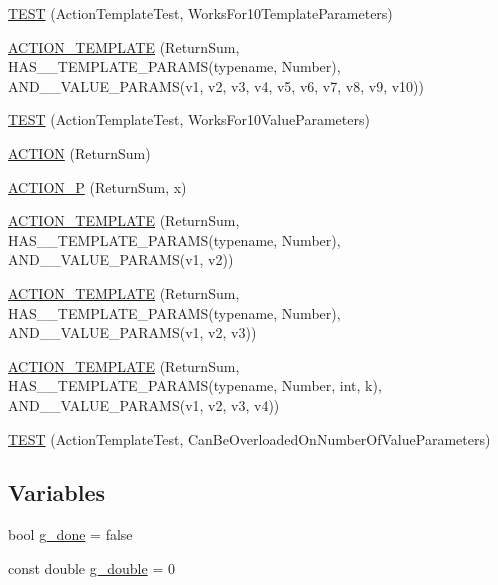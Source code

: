 \begin{DoxyCompactItemize}
\item 
\hyperlink{namespacetesting_1_1gmock__generated__actions__test_a39707e50b998b0866ea7dec54099f38f}{T\+E\+ST} (Action\+Template\+Test, Works\+For10\+Template\+Parameters)
\item 
\hyperlink{namespacetesting_1_1gmock__generated__actions__test_a0e21a6c1f43a7125a29e6e1edcd7006c}{A\+C\+T\+I\+O\+N\+\_\+\+T\+E\+M\+P\+L\+A\+TE} (Return\+Sum, H\+A\+S\+\_\+\_\+\+T\+E\+M\+P\+L\+A\+T\+E\+\_\+\+P\+A\+R\+A\+MS(typename, Number), A\+N\+D\+\_\+\_\+\+V\+A\+L\+U\+E\+\_\+\+P\+A\+R\+A\+MS(v1, v2, v3, v4, v5, v6, v7, v8, v9, v10))
\item 
\hyperlink{namespacetesting_1_1gmock__generated__actions__test_aa8dd9ea1777fe67626bab2815b7261f4}{T\+E\+ST} (Action\+Template\+Test, Works\+For10\+Value\+Parameters)
\item 
\hyperlink{namespacetesting_1_1gmock__generated__actions__test_a49c180470c75de1ab88cd2928e738d33}{A\+C\+T\+I\+ON} (Return\+Sum)
\item 
\hyperlink{namespacetesting_1_1gmock__generated__actions__test_acae7628c76df0e3b54ea80459fe3cf60}{A\+C\+T\+I\+O\+N\+\_\+P} (Return\+Sum, x)
\item 
\hyperlink{namespacetesting_1_1gmock__generated__actions__test_a0d95dcce021580cf2a2af2a91348a01b}{A\+C\+T\+I\+O\+N\+\_\+\+T\+E\+M\+P\+L\+A\+TE} (Return\+Sum, H\+A\+S\+\_\+\_\+\+T\+E\+M\+P\+L\+A\+T\+E\+\_\+\+P\+A\+R\+A\+MS(typename, Number), A\+N\+D\+\_\+\_\+\+V\+A\+L\+U\+E\+\_\+\+P\+A\+R\+A\+MS(v1, v2))
\item 
\hyperlink{namespacetesting_1_1gmock__generated__actions__test_a5241672e22af49093d3601ac42c9a5ca}{A\+C\+T\+I\+O\+N\+\_\+\+T\+E\+M\+P\+L\+A\+TE} (Return\+Sum, H\+A\+S\+\_\+\_\+\+T\+E\+M\+P\+L\+A\+T\+E\+\_\+\+P\+A\+R\+A\+MS(typename, Number), A\+N\+D\+\_\+\_\+\+V\+A\+L\+U\+E\+\_\+\+P\+A\+R\+A\+MS(v1, v2, v3))
\item 
\hyperlink{namespacetesting_1_1gmock__generated__actions__test_a03e55dabaa60ff2cda602c702ef3ff76}{A\+C\+T\+I\+O\+N\+\_\+\+T\+E\+M\+P\+L\+A\+TE} (Return\+Sum, H\+A\+S\+\_\+\_\+\+T\+E\+M\+P\+L\+A\+T\+E\+\_\+\+P\+A\+R\+A\+MS(typename, Number, int, k), A\+N\+D\+\_\+\_\+\+V\+A\+L\+U\+E\+\_\+\+P\+A\+R\+A\+MS(v1, v2, v3, v4))
\item 
\hyperlink{namespacetesting_1_1gmock__generated__actions__test_aa84c5b4f29e052340459e12649ce7209}{T\+E\+ST} (Action\+Template\+Test, Can\+Be\+Overloaded\+On\+Number\+Of\+Value\+Parameters)
\end{DoxyCompactItemize}
\subsection*{Variables}
\begin{DoxyCompactItemize}
\item 
bool \hyperlink{namespacetesting_1_1gmock__generated__actions__test_a5f828d39e27f0615498d5aa31c96916e}{g\+\_\+done} = false
\item 
const double \hyperlink{namespacetesting_1_1gmock__generated__actions__test_aa10d8101300a51dd20ab028fa9971313}{g\+\_\+double} = 0
\end{DoxyCompactItemize}


